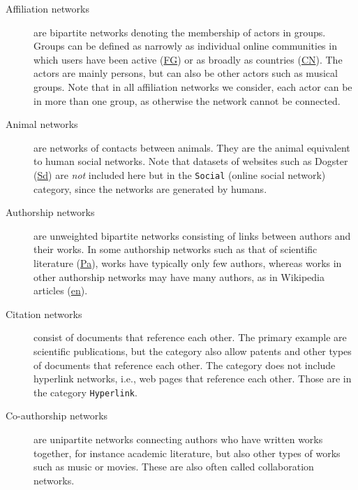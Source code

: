 \documentclass{article}
\begin{document}
\begin{description}
\item[Affiliation networks] are bipartite networks denoting the
  membership of actors in groups.  Groups can be defined as narrowly as
  individual online communities in which users have been active
  (\href{http://konect.cc/networks/flickr-groupmemberships/}{\textsf{FG}})
  or as broadly as countries
  (\href{http://konect.cc/networks/dbpedia-country/}{\textsf{CN}}). The
  actors are mainly persons, but can also be other actors such as musical
  groups. Note that in all affiliation networks we consider, each actor
  can be in more than one group, as otherwise the network cannot be
  connected.

\item[Animal networks] are networks of contacts between animals.  
  They are the animal equivalent to human social networks.  Note that
  datasets of websites such as Dogster
  (\href{http://konect.cc/networks/petster-friendships-dog/}{\textsf{Sd}})
  are \emph{not} included here but in the \texttt{Social} (online social
  network) category, since the networks are generated by humans. 

\item[Authorship networks] are unweighted bipartite networks consisting
  of links between authors and their works.  In some authorship networks
  such as that of scientific literature
  (\href{http://konect.cc/networks/dblp-author/}{\textsf{Pa}}),
  works have typically only few authors, whereas works in other
  authorship networks may have many authors, as in Wikipedia articles
    (\href{http://konect.cc/networks/edit-enwiki/}{\textsf{en}}).

\item[Citation networks] consist of documents that reference each
  other.  The primary example are scientific publications, but the
  category also allow patents and other types of documents that
  reference each other.  The category does not include hyperlink
  networks, i.e., web pages that reference each other.  Those are in the
  category \texttt{Hyperlink}. 

\item[Co-authorship networks] are unipartite networks connecting authors
  who have written works together, for instance academic literature, but
  also other types of works such as music or movies.  These are also
  often called collaboration networks.  


\end{description}
\end{document}
